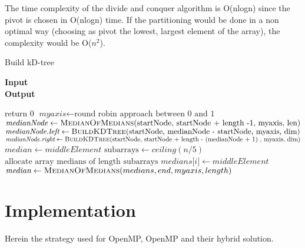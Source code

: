 \documentclass[11pt]{article}
\begin{document}
The time complexity of the divide and conquer algorithm is O(nlogn) since the pivot is chosen in O(nlogn) time. If the partitioning would be done in a non optimal way (choosing as pivot the lowest, largest element of the array), the complexity would be O($n^2$).
\begin{algorithm}[H]
\caption{Build kD-tree}
\hspace*{\algorithmicindent} \textbf{Input}  \\
\hspace*{\algorithmicindent} \textbf{Output} 
\begin{algorithmic}[1]
\Statex
{}
\State return 0
\EndIf
\Statex
\State $\textit{myaxis} \gets \text{round robin approach between 0 and 1}$
\Statex
\State $\textit{medianNode} \gets \Call{MedianOfMedians}{$startNode, startNode + length -1, myaxis, len$}$
\Statex
\State $\textit{medianNode.left} \gets \Call{BuildKDTree}{$startNode, medianNode - startNode, myaxis, dim$}$
\State $\textit{medianNode.right} \gets \Call{BuildKDTree}{$startNode, startNode + length - (medianNode + 1) , myaxis, dim$}$
\State \Return {}
\EndFunction
\Statex
{}
\State {}
\State $\textit{median} \gets middleElement$
\Else
\State $\text{subarrays} \gets ceiling(n/5)$
\State $\text{allocate array medians of length subarrays}$
\State {}
\State $\textit{medians[i]} \gets middleElement$
\EndFor
\Statex
{}
\State $\textit{median} \gets \Call{MedianOfMedians}{medians, end, myaxis, length}$
\EndIf
\EndIf
\State \Return {}
\EndFunction
\Statex
{}
\State {}
\EndProcedure
\end{algorithmic}
\end{algorithm}
\section{Implementation}

Herein the strategy used for OpenMP, OpenMP and their hybrid solution.
\end{document}
